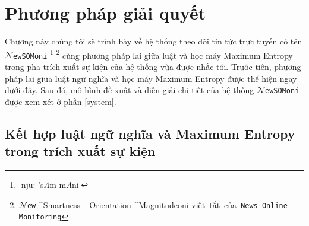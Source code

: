 
\chapter{Phương pháp giải quyết} %



\ifpdf
    \graphicspath{{3/figures/PNG/}{3/figures/PDF/}{3/figures/}}
\else
    \graphicspath{{3/figures/EPS/}{3/figures/}}
\fi



\noindent Chương này chúng tôi sẽ trình bày về hệ thống theo dõi tin tức trực tuyến có tên $\mathcal{N}$\texttt{ewSOMoni}
\footnote{[nju: 's$\Lambda$m m$\Lambda$ni]} \footnote{$\mathcal{N}$\texttt{ew} ^{\mbox{Smartness}} _{\mbox{Orientation}} ^{\mbox{Magnitude}}oni \hspace{0.2in}   \mbox{viết tắt của \texttt{News Online Monitoring}}} cùng  phương pháp lai giữa luật và học máy Maximum Entropy trong pha trích xuất sự kiện của hệ thống vừa được nhắc tới. %
Trước tiên, phương pháp lai giữa luật ngữ nghĩa và học máy Maximum Entropy được thể hiện ngay dưới đây. Sau đó, mô hình đề xuất và diễn giải chi tiết của hệ thống $\mathcal{N}$\texttt{ewSOMoni} được xem xét ở phần \ref{system}.



\section{Kết hợp luật ngữ nghĩa  và Maximum Entropy trong trích xuất sự kiện}
\label{method}


